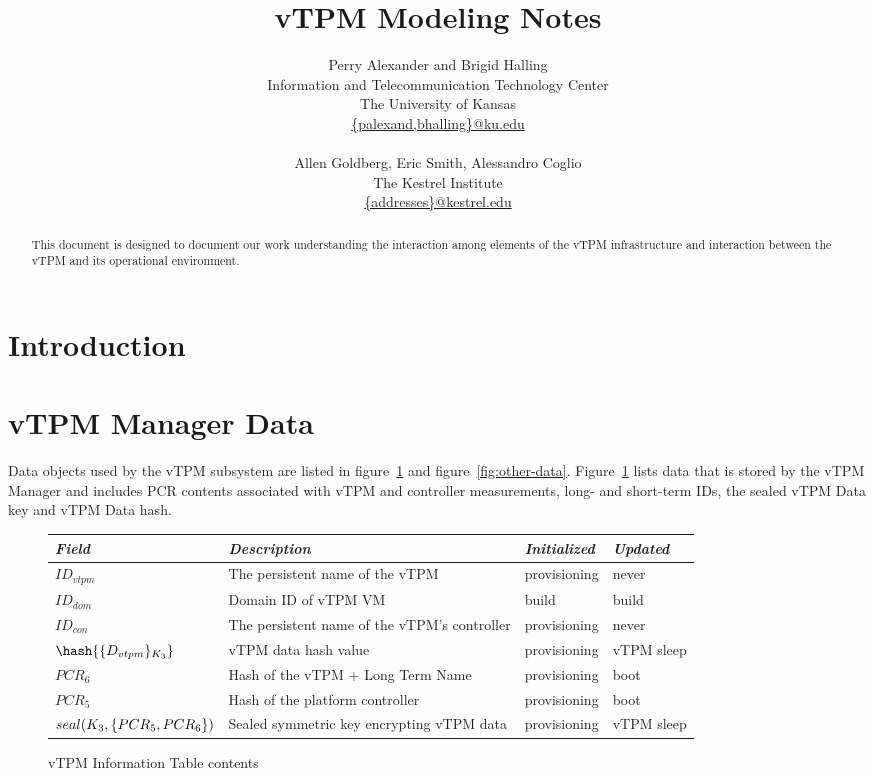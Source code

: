 \documentclass[10pt]{article}
\title{vTPM Modeling Notes}
\author{Perry Alexander and Brigid Halling \\
  Information and Telecommunication Technology Center \\
  The University of Kansas \\
  \url{{palexand,bhalling}@ku.edu} \\
  \\
  Allen Goldberg, Eric Smith, Alessandro Coglio \\
  The Kestrel Institute \\
  \url{{addresses}@kestrel.edu}}
\begin{document}
\maketitle
\tableofcontents
\listoffigures
\listoftables

\newtheorem{invariant}{Invariant}
\newtheorem{post}{Postcondition}
\newtheorem{pre}{Precondition}

\begin{abstract}
  This document is designed to document our work understanding the
  interaction among elements of the vTPM infrastructure and
  interaction between the vTPM and its operational environment.
\end{abstract}

\section{Introduction}

\section{vTPM Manager Data}

Data objects used by the vTPM subsystem are listed in
figure~\ref{fig:vtpm-information-table-format} and
figure~\ref{fig:other-data}.
Figure~\ref{fig:vtpm-information-table-format} lists data that is
stored by the vTPM Manager and includes PCR contents associated with
vTPM and controller measurements, long- and short-term IDs, the sealed
vTPM Data key and vTPM Data hash.

\begin{figure}[hbtp]
  \centering
  \begin{tabular}{llll}
    \emph{Field} & \emph{Description} & \emph{Initialized} &
    \emph{Updated} \\ \hline
    $ID_{vtpm}$ & The persistent name of the vTPM & provisioning &
    never \\
    $ID_{dom}$ & Domain ID of vTPM VM & build & build \\
    $ID_{con}$ & The persistent name of the vTPM's controller &
    provisioning & never \\
    $\hash{\encrypt{D_{vtpm}}{K_3}}$ & vTPM data hash value & provisioning & vTPM sleep \\
    $PCR_6$ & Hash of the vTPM + Long Term Name & provisioning & boot
    \\
    $PCR_5$ & Hash of the platform controller & provisioning & boot \\
    $seal(K_{3},\{PCR_5,PCR_6\})$ & Sealed symmetric key encrypting vTPM data &
    provisioning & vTPM sleep \\
  \end{tabular}
  \caption{vTPM Information Table contents}
  \label{fig:vtpm-information-table-format}
\end{figure}
\end{document}
